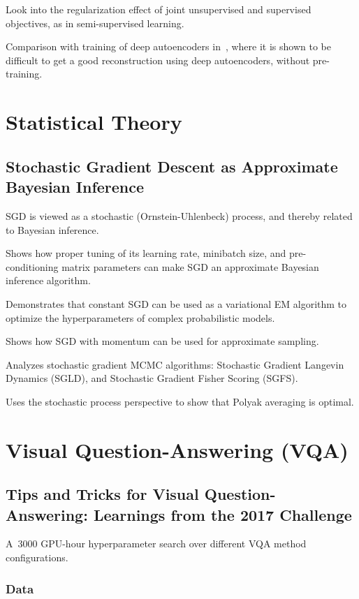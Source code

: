 \documentclass[a4paper, 12pt]{article}
\begin{document}
Look into the regularization effect of joint unsupervised and supervised
objectives, as in semi-supervised learning.

Comparison with training of deep autoencoders in~\citet{HinSal06}, where it is
shown to be difficult to get a good reconstruction using deep autoencoders,
without pre-training.


\section{Statistical Theory}

\subsection{Stochastic Gradient Descent as Approximate Bayesian
            Inference~\citet{mandt-sgd-2017}}

SGD is viewed as a stochastic (Ornstein-Uhlenbeck) process, and thereby related
to Bayesian inference.

Shows how proper tuning of its learning rate, minibatch size, and
pre-conditioning matrix parameters can make SGD an approximate Bayesian
inference algorithm.

Demonstrates that constant SGD can be used as a variational EM algorithm to
optimize the hyperparameters of complex probabilistic models.

Shows how SGD with momentum can be used for approximate sampling.

Analyzes stochastic gradient MCMC algorithms: Stochastic Gradient Langevin
Dynamics (SGLD), and Stochastic Gradient Fisher Scoring (SGFS).

Uses the stochastic process perspective to show that Polyak averaging is
optimal.


\section{Visual Question-Answering (VQA)}

\subsection{Tips and Tricks for Visual Question-Answering: Learnings from the
            2017 Challenge}

A~\num{3000} GPU-hour hyperparameter search over different VQA method
configurations.


\subsubsection{Data}
\end{document}
